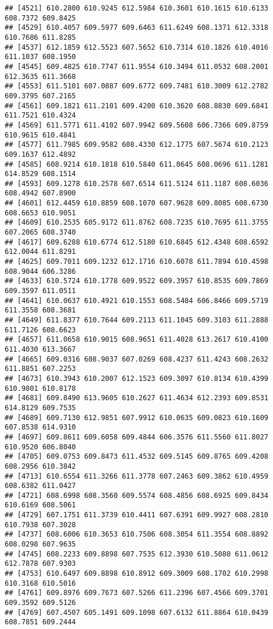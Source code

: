 \documentclass[
]{article}
\begin{document}
\begin{verbatim}
## [4521] 610.2800 610.9245 612.5984 610.3601 610.1615 610.6133 608.7372 609.8425
## [4529] 610.4057 609.5977 609.6463 611.6249 608.1371 612.3318 610.7686 611.8285
## [4537] 612.1859 612.5523 607.5652 610.7314 610.1826 610.4016 611.1037 608.1950
## [4545] 609.4825 610.7747 611.9554 610.3494 611.0532 608.2001 612.3635 611.3668
## [4553] 611.5101 607.0887 609.6772 609.7481 610.3009 612.2782 609.3795 607.2165
## [4561] 609.1821 611.2101 609.4200 610.3620 608.8830 609.6841 611.7521 610.4324
## [4569] 611.5771 611.4102 607.9942 609.5608 606.7366 609.8759 610.9615 610.4841
## [4577] 611.7985 609.9582 608.4330 612.1775 607.5674 610.2123 609.1637 612.4892
## [4585] 608.9214 610.1818 610.5840 611.0645 608.0696 611.1281 614.8529 608.1514
## [4593] 609.1278 610.2578 607.6514 611.5124 611.1187 608.6036 608.4942 607.8900
## [4601] 612.4459 610.8859 608.1070 607.9628 609.8085 608.6730 608.6653 610.9051
## [4609] 610.2535 605.9172 611.8762 608.7235 610.7695 611.3755 607.2065 608.3740
## [4617] 609.6288 610.6774 612.5180 610.6845 612.4348 608.6592 612.0044 611.8291
## [4625] 609.7011 609.1232 612.1716 610.6078 611.7894 610.4598 608.9044 606.3286
## [4633] 610.5724 610.1778 609.9522 609.3957 610.8535 609.7869 609.3597 611.0511
## [4641] 610.0637 610.4921 610.1553 608.5484 606.8466 609.5719 611.3558 608.3681
## [4649] 611.8377 610.7644 609.2113 611.1045 609.3103 611.2888 611.7126 608.6623
## [4657] 611.0658 610.9015 608.9651 611.4028 613.2617 610.4100 611.4030 613.3667
## [4665] 609.0316 608.9037 607.0269 608.4237 611.4243 608.2632 611.8851 607.2253
## [4673] 610.3943 610.2007 612.1523 609.3097 610.8134 610.4399 610.9801 610.8178
## [4681] 609.8490 613.9605 610.2627 611.4634 612.2393 609.8531 614.8129 609.7535
## [4689] 609.7130 612.9851 607.9912 610.0635 609.0823 610.1609 607.8538 614.9310
## [4697] 609.8611 609.6058 609.4844 606.3576 611.5560 611.8027 610.9520 606.8040
## [4705] 609.0753 609.8473 611.4532 609.5145 609.8765 609.4208 608.2956 610.3842
## [4713] 610.6554 611.3266 611.3778 607.2463 609.3862 610.4959 608.6382 611.0427
## [4721] 608.6998 608.3560 609.5574 608.4856 608.6925 609.8434 610.6169 608.5061
## [4729] 607.1751 611.3739 610.4411 607.6391 609.9927 608.2810 610.7938 607.3028
## [4737] 608.6006 610.3653 610.7506 608.3054 611.3554 608.8892 608.0298 607.9635
## [4745] 608.2233 609.8898 607.7535 612.3930 610.5080 611.0612 612.7878 607.9303
## [4753] 610.6497 609.8898 610.8912 609.3009 608.1702 610.2998 610.3168 610.5016
## [4761] 609.8976 609.7673 607.5266 611.2396 607.4566 609.3701 609.3592 609.5126
## [4769] 607.4507 605.1491 609.1098 607.6132 611.8864 610.0439 608.7851 609.2444

\end{verbatim}
\end{document}

